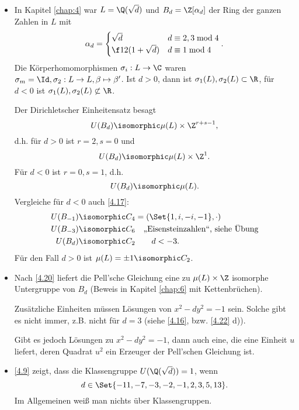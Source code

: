 \begin{nt}
	\begin{itemize}
		\item
			In Kapitel \ref{chap:4} war $L = \Q(\sqrt d)$ und $B_d = \Z[\alpha_d]$ der Ring der ganzen Zahlen in $L$ mit
			\[
				\alpha_d = \begin{cases}
					\sqrt d & d \equiv 2, 3 \bmod 4 \\
					\f 12 (1 + \sqrt d) & d \equiv 1 \bmod 4
				\end{cases}.
			\]
			Die Körperhomomorphismen $\sigma_i: L \to \C$ waren $\sigma_m = \Id, \sigma_2: L \to L, \beta \mapsto \beta'$.
			Ist $d > 0$, dann ist $\sigma_1(L), \sigma_2(L) \subset \R$, für $d < 0$ ist $\sigma_1(L), \sigma_2(L) \not\subset \R$.

			Der Dirichletscher Einheitensatz besagt
			\[
				U(B_d) \isomorphic \mu(L) \times \Z^{r+s-1},
			\]
			d.h. für $d > 0$ ist $r = 2, s = 0$ und
			\[
				U(B_d) \isomorphic \mu(L) \times \Z^1.
			\]
			Für $d < 0$ ist $r = 0, s = 1$, d.h.
			\[
				U(B_d) \isomorphic \mu(L).
			\]
			Vergleiche für $d < 0$ auch \ref{4.17}:
			\begin{align*}
				U(B_{-1}) &\isomorphic C_4 = (\Set{1, i, -i, -1}, \cdot) \\
				U(B_{-3}) &\isomorphic C_6  \quad \text{„Eisensteinzahlen“, siehe Übung} \\
				U(B_d) &\isomorphic C_2 \qquad d < -3.
			\end{align*}
			Für den Fall $d > 0$ ist $\mu(L) = \pm 1 \isomorphic C_2$.

		\item
			Nach \ref{4.20} liefert die Pell'sche Gleichung eine zu $\mu(L) \times \Z$ isomorphe Untergruppe von $B_d$ (Beweis in Kapitel \ref{chap:6} mit Kettenbrüchen).

			Zusätzliche Einheiten müssen Lösungen von $x^2 - dy^2 = -1$ sein.
			Solche gibt es nicht immer, z.B. nicht für $d = 3$ (siehe \ref{4.16}, bzw. \ref{4.22} d)).

			Gibt es jedoch Lösungen zu $x^2 - dy^2 = -1$, dann auch eine, die eine Einheit $u$ liefert, deren Quadrat $u^2$ ein Erzeuger der Pell'schen Gleichung ist.
		\item
			\ref{4.9} zeigt, dass die Klassengruppe $U(\Q(\sqrt d)) = 1$, wenn
			\[
				d \in \Set{-11, -7, -3, -2, -1, 2, 3, 5, 13}.
			\]
			Im Allgemeinen weiß man nichts über Klassengruppen.
	\end{itemize}
\end{nt}

